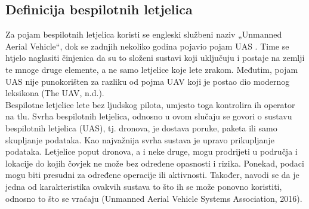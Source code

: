 \documentclass[times, utf8, diplomski]{fer}
\begin{document}
\subsection{Definicija bespilotnih letjelica}
Za pojam bespilotnih letjelica koristi se engleski službeni naziv „Unmanned Aerial Vehicle“,  dok  se  zadnjih  nekoliko  godina  pojavio  pojam  UAS  . Time se htjelo naglasiti činjenica da su to složeni sustavi koji uključuju i postaje na zemlji te mnoge druge elemente, a ne samo letjelice koje lete zrakom. Međutim, pojam UAS nije punokorišten za razliku od pojma UAV koji je postao dio modernog leksikona 
(The UAV, n.d.).\\
Bespilotne letjelice lete bez ljudskog pilota, umjesto toga kontrolira ih operator na tlu. Svrha bespilotnih letjelica, odnosno u ovom slučaju se govori o sustavu bespilotnih letjelica (UAS),  tj.  dronova, je  dostava poruke,  paketa  ili  samo  skupljanje  podataka. Kao najvažnija svrha sustava je upravo prikupljanje podataka. Letjelice poput dronova, a i neke druge, mogu prodrijeti  u  područja  i  lokacije  do  kojih  čovjek  ne  može  bez  određene  opasnosti  i  rizika. Ponekad, podaci mogu biti presudni za određene operacije ili aktivnosti. Također, navodi se da je jedna od karakteristika ovakvih sustava to što ih se može ponovno koristiti, odnosno to što se vraćaju (Unmanned Aerial Vehicle Systems Association, 2016).
\end{document}
